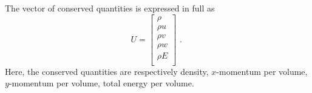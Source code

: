 The vector of conserved quantities is expressed in full as
\begin{equation}
 U = \left [ \begin{array}{c} \rho \\ 
                              \rho u \\ 
                              \rho v \\ 
                              \rho w \\ 
                              \rho E \\ 
             \end{array} \right ] \text{ . }
 \label{eq:U_vector_3D}
\end{equation}
Here, the conserved quantities are respectively density, $x$-momentum per volume, $y$-momentum per volume, total energy per volume.

